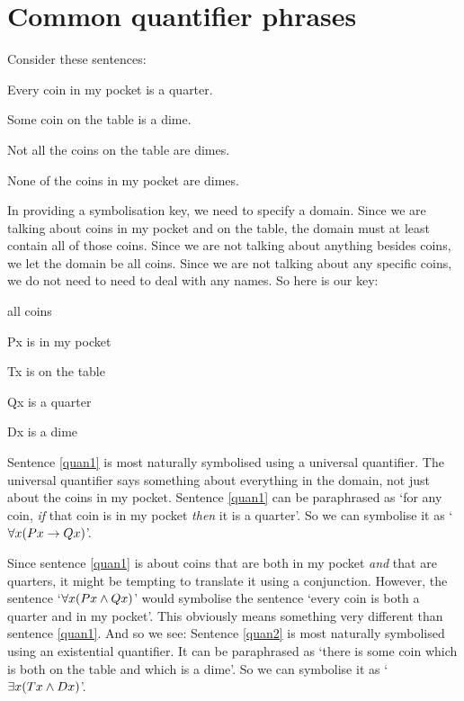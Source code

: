 

\section{Common quantifier phrases}
Consider these sentences:
	\begin{earg}
		\item[\ex{quan1}] Every coin in my pocket is a quarter.
		\item[\ex{quan2}] Some coin on the table is a dime.
		\item[\ex{quan3}] Not all the coins on the table are dimes.
		\item[\ex{quan4}] None of the coins in my pocket are dimes.
	\end{earg}
In providing a symbolisation key, we need to specify a domain. Since we are talking about coins in my pocket and on the table, the domain must at least contain all of those coins. Since we are not talking about anything besides coins, we let the domain be all coins. Since we are not talking about any specific coins, we do not need to need to deal with any names. So here is our key:
	\begin{ekey}
		\item[\text{domain}] all coins
		\item[Px]  is in my pocket
		\item[Tx]  is on the table
		\item[Qx]  is a quarter
		\item[Dx]  is a dime
	\end{ekey}
Sentence \ref{quan1} is most naturally symbolised using a universal quantifier. The universal quantifier says something about everything in the domain, not just about the coins in my pocket. Sentence \ref{quan1} can be paraphrased as `for any coin, \emph{if} that coin is in my pocket \emph{then} it is a quarter'. So we can symbolise it as `$\forall x(Px \rightarrow Qx)$'.

Since sentence \ref{quan1} is about coins that are both in my pocket \emph{and} that are quarters, it might be tempting to translate it using a conjunction. However, the sentence `$\forall x(Px \wedge Qx)$' would symbolise the sentence `every coin is both a quarter and in my pocket'. This obviously means something very different than sentence \ref{quan1}. And so we see:
Sentence \ref{quan2} is most naturally symbolised using an existential quantifier. It can be paraphrased as `there is some coin which is both on the table and which is a dime'. So we can symbolise it as `$\exists x(Tx \wedge Dx)$'.

